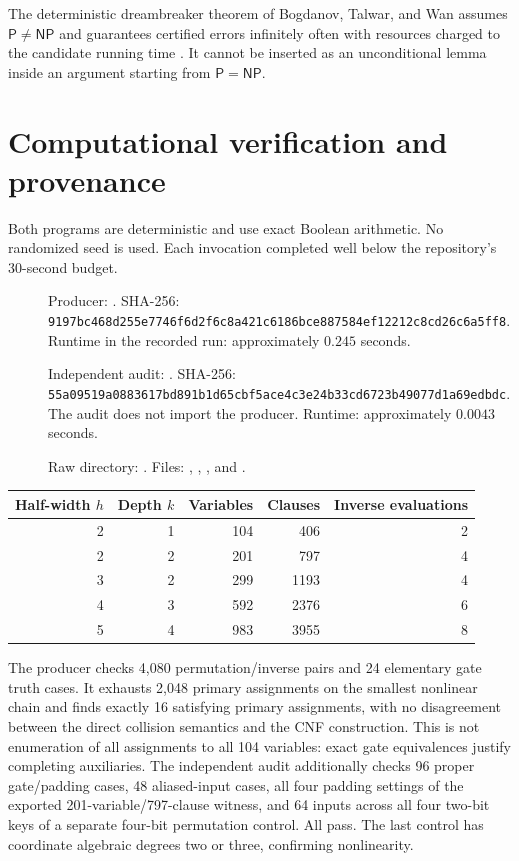 \documentclass[11pt]{article}
\begin{document}
The deterministic dreambreaker theorem of Bogdanov, Talwar, and Wan
assumes $\mathsf P\ne\mathsf{NP}$ and guarantees certified errors
infinitely often with resources charged to the candidate running time
\cite{bogdanov2010}. It cannot be inserted as an unconditional lemma
inside an argument starting from $\mathsf P=\mathsf{NP}$.

\section{Computational verification and provenance}

Both programs are deterministic and use exact Boolean arithmetic.
No randomized seed is used. Each invocation completed well below
the repository's 30-second budget.
\begin{description}
\item[] Producer:
.
SHA-256:
\texttt{9197bc468d255e7746f6d2f6c8a421c6186bce887584ef12212c8cd26c6a5ff8}.
Runtime in the recorded run: approximately $0.245$ seconds.
\item[] Independent audit:
.
SHA-256:
\texttt{55a09519a0883617bd891b1d65cbf5ace4c3e24b33cd6723b49077d1a69edbdc}.
The audit does not import the producer.
Runtime: approximately $0.0043$ seconds.
\item[] Raw directory:
.
Files: ,
, ,
and .
\end{description}

\begin{center}
\begin{tabular}{rrrrr}
\toprule
Half-width $h$ & Depth $k$ & Variables & Clauses & Inverse evaluations\\
\midrule
2&1&104&406&2\\
2&2&201&797&4\\
3&2&299&1193&4\\
4&3&592&2376&6\\
5&4&983&3955&8\\
\bottomrule
\end{tabular}
\end{center}

The producer checks 4,080 permutation/inverse pairs and 24 elementary
gate truth cases. It exhausts 2,048 primary assignments on the smallest
nonlinear chain and finds exactly 16 satisfying primary assignments,
with no disagreement between the direct collision semantics and the
CNF construction. This is not enumeration of all assignments to all
104 variables: exact gate equivalences justify completing auxiliaries.
The independent audit additionally checks 96 proper gate/padding cases,
48 aliased-input cases, all four padding settings of the exported
201-variable/797-clause witness, and 64 inputs across all four two-bit
keys of a separate four-bit permutation control. All pass.
The last control has coordinate algebraic degrees two or three,
confirming nonlinearity.
\end{document}
